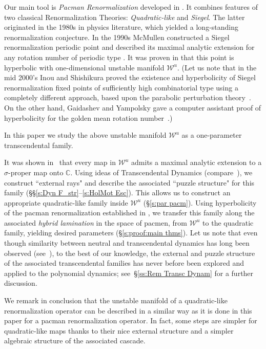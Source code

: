 \documentclass{amsart}
\newcommand{\1}{{\mathbb 1 }}
\newcommand\WW{\mathcal{W}}
\newcommand{\C}{\mathbb{C}}
\theoremstyle{remark}
\numberwithin{equation}{section}
\theoremstyle{definition}
\theoremstyle{nonumberbreak}
\begin{document}
 
 
 Our main tool is {\em Pacman Renormalization} developed in \cite{DLS}.
It combines features of two classical Renormalization Theories: {\em  Quadratic-like}  and {\em Siegel}.  
The latter   
originated in the 1980s in  physics literature, which yielded a  long-standing renormalization conjecture. 
In the 1990s  McMullen constructed a Siegel renormalization periodic point  and described its maximal analytic extension for 
any rotation number of periodic type \cite{McM3}. It was  proven in \cite{DLS} that this point is hyperbolic with one-dimensional unstable manifold $\WW^u$. (Let us note that in the mid 2000’s Inou and Shishikura proved the existence and hyperbolicity of Siegel renormalization fixed points of sufficiently high combinatorial type using a completely different approach, based upon the parabolic perturbation theory~\cite{IS}. On the other hand, Gaidashev and Yampolsky gave a computer assistant proof of hyperbolicity for the golden mean rotation number~\cite{GY}.)


In this paper we study the above unstable manifold $\WW^u$ as a one-parameter transcendental family. 

It was shown in~\cite{DLS} that every map in $\WW^u$ admits a maximal analytic extension to a $\sigma$-proper map onto $\C$. Using ideas of Transcendental Dynamics (compare~\cites{DK,  EL,E, SZ, RRRS,Re,BL,BR}), we construct ``external rays" and describe the associated 
``puzzle structure" for this family (\S\S \ref{s:Dyn F_str}--\ref{s:HolMot Esc}). This allows us to construct an appropriate quadratic-like family inside  $\WW^u$
(\S \ref{s:par pacm}). Using hyperbolicity of the pacman renormalization established in \cite{DLS}, we transfer this family along the associated {\em hybrid lamination} in the space of pacmen,
from $\WW^u$ to the quadratic family,  yielding desired parameters (\S \ref{s:proof:main thms}). Let us note that even though similarity between neutral and transcendental dynamics has long been observed (see~\cites{Ep,Sh:HD,SY,CS}), to the best of our knowledge, the external and puzzle structure of the associated transcendental families has never before been explored and applied to the polynomial dynamics; see~\S\ref{ss:Rem Transc Dynam} for a further discussion.


We remark in conclusion that the unstable manifold of a quadratic-like renormalization operator can be described in a similar way as it is done in this paper for a pacman renormalization operator. In fact, some steps are simpler for quadratic-like maps thanks to their nice external structure and a simpler algebraic structure of the associated cascade.
\end{document}
